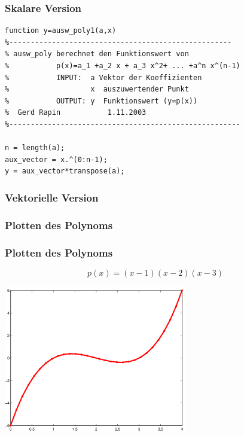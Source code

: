 \documentclass[hyperref={xetex}]{beamer}
\begin{document}
\begin{frame}[fragile]\frametitle{Skalare Version}
\begin{lstlisting}
function y=ausw_poly1(a,x)
%----------------------------------------------------
% ausw_poly berechnet den Funktionswert von 
%           p(x)=a_1 +a_2 x + a_3 x^2+ ... +a^n x^(n-1)
%           INPUT:  a Vektor der Koeffizienten 
%                   x  auszuwertender Punkt
%           OUTPUT: y  Funktionswert (y=p(x))
%  Gerd Rapin           1.11.2003
%------------------------------------------------------

n = length(a);
aux_vector = x.^(0:n-1);
y = aux_vector*transpose(a);
\end{lstlisting}
\end{frame}
\begin{frame}[fragile]\frametitle{Vektorielle Version}

\end{frame}
\begin{frame}[fragile]\frametitle{Plotten des Polynoms}

\end{frame}
\begin{frame}[fragile]\frametitle{Plotten des Polynoms}
\[p(x) = (x-1)(x-2)(x-3) \]
\begin{center}
\includegraphics[width=0.6\textwidth]{figures/polynom_03_11} 
\end{center}

\end{frame}
\end{document}
